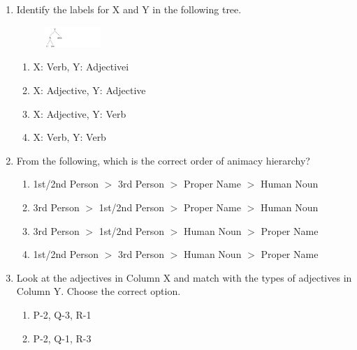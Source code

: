 \documentclass[12pt]{article}
\theoremstyle{remark}
\begin{document}
\begin{enumerate}
\begin{enumerate}
\end{enumerate}
\hfill{}
\item Identify the labels for X and Y in the following tree.
\begin{figure}[H]
\centering
\includegraphics[width=0.2\textwidth]{Figs/Q54.png}
\caption{}
\label{fig:3.5}
\end{figure}
\begin{enumerate} 
\item X: Verb, Y: Adjectivei
\item X: Adjective, Y: Adjective
\item X: Adjective, Y: Verb
\item X: Verb, Y: Verb
\end{enumerate}
\hfill{}
\item From the following, which is the correct order of animacy hierarchy?
\begin{enumerate} 
\item 1st/2nd Person $>$ 3rd Person $>$ Proper Name $>$ Human Noun
\item 3rd Person $>$ 1st/2nd Person $>$ Proper Name $>$ Human Noun
\item 3rd Person $>$ 1st/2nd Person $>$ Human Noun $>$ Proper Name
\item 1st/2nd Person $>$ 3rd Person $>$ Human Noun $>$ Proper Name
\end{enumerate}
\hfill{}
\item Look at the adjectives in Column X and match with the types of adjectives in Column Y. Choose the correct option.
\begin{table}[H]
    \centering 

    \caption{}
    \label{tab:ling_q56}
\end{table}
\begin{enumerate} 
\item P-2, Q-3, R-1
\item P-2, Q-1, R-3

\end{enumerate}
\end{enumerate}
\end{document}
